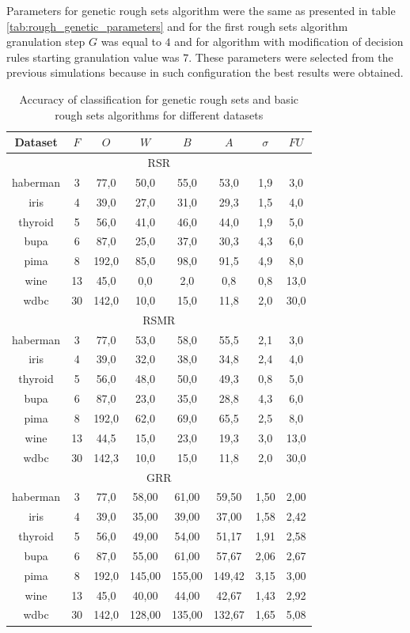 Parameters for genetic rough sets algorithm were the same as presented in table
\ref{tab:rough_genetic_parameters} and for the first rough sets algorithm
granulation step $G$ was equal to $4$ and for algorithm with modification of
decision rules starting granulation value was $7$. These parameters were
selected from the previous simulations because in such configuration the best
results were obtained.
\begin{table}[H]
    \caption{Accuracy of classification for genetic rough sets and basic rough
    sets algorithms for different datasets}
    \centering
    \begin{tabular}{|c|c|c|c|c|c|c|c|}
        \hline
        Dataset&$F$&$O$&$W$&$B$&$A$&$\sigma$&$FU$\\ \hline \hline
        \multicolumn{8}{|c|}{RSR}\\ \hline
        haberman&3&77,0&50,0&55,0&53,0&1,9&3,0\\ \hline
        iris&4&39,0&27,0&31,0&29,3&1,5&4,0\\ \hline
        thyroid&5&56,0&41,0&46,0&44,0&1,9&5,0\\ \hline
        bupa&6&87,0&25,0&37,0&30,3&4,3&6,0\\ \hline
        pima&8&192,0&85,0&98,0&91,5&4,9&8,0\\ \hline
        wine&13&45,0&0,0&2,0&0,8&0,8&13,0\\ \hline
        wdbc&30&142,0&10,0&15,0&11,8&2,0&30,0\\ \hline \hline

        \multicolumn{8}{|c|}{RSMR}\\ \hline
        haberman&3&77,0&53,0&58,0&55,5&2,1&3,0\\ \hline
        iris&4&39,0&32,0&38,0&34,8&2,4&4,0\\ \hline
        thyroid&5&56,0&48,0&50,0&49,3&0,8&5,0\\ \hline
        bupa&6&87,0&23,0&35,0&28,8&4,3&6,0\\ \hline
        pima&8&192,0&62,0&69,0&65,5&2,5&8,0\\ \hline
        wine&13&44,5&15,0&23,0&19,3&3,0&13,0\\ \hline
        wdbc&30&142,3&10,0&15,0&11,8&2,0&30,0\\ \hline \hline

        \multicolumn{8}{|c|}{GRR}\\ \hline
        haberman&3&77,0&58,00&61,00&59,50&1,50&2,00\\ \hline
        iris&4&39,0&35,00&39,00&37,00&1,58&2,42\\ \hline
        thyroid&5&56,0&49,00&54,00&51,17&1,91&2,58\\ \hline
        bupa&6&87,0&55,00&61,00&57,67&2,06&2,67\\ \hline
        pima&8&192,0&145,00&155,00&149,42&3,15&3,00\\ \hline
        wine&13&45,0&40,00&44,00&42,67&1,43&2,92\\ \hline
        wdbc&30&142,0&128,00&135,00&132,67&1,65&5,08\\ \hline
    \end{tabular}
    \label{tab:genetic_rough_results}
\end{table}
